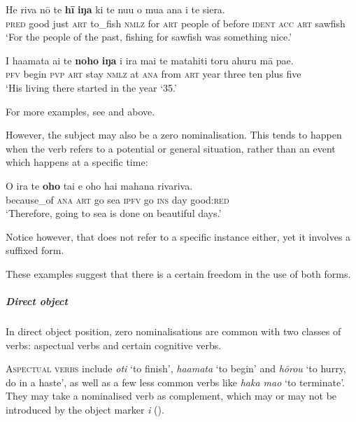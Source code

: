 \ea\label{ex:3.35}
\gll He riva nō te \textbf{hī} \textbf{iŋa} ki te nu{\ꞌ}u o mu{\ꞌ}a {\ꞌ}ana i te siera.\\
\textsc{pred} good just \textsc{art} to\_fish \textsc{nmlz} for \textsc{art} people of before \textsc{ident} \textsc{acc} \textsc{art} sawfish\\

\glt 
‘For the people of the past, fishing for sawfish was something nice.’ \textstyleExampleref{[R364.019]} 
\z

\ea\label{ex:3.36}
\gll I ha{\ꞌ}amata ai te \textbf{noho} \textbf{iŋa} {\ꞌ}i ira mai te matahiti toru {\ꞌ}ahuru mā pae. \\
\textsc{pfv} begin \textsc{pvp} \textsc{art} stay \textsc{nmlz} at \textsc{ana} from \textsc{art} year three ten plus five \\

\glt
‘His living there started in the year ‘35.’ \textstyleExampleref{[R539-1.492]}
\z

For more examples, see  and  above.

\newpage 
However, the subject may also be a zero nominalisation. This tends to happen when the verb refers to a potential or general situation, rather than an event which happens at a specific time:

\ea\label{ex:3.37}
\gll {\ꞌ}O ira te \textbf{oho} tai e oho hai mahana rivariva.\\
because\_of \textsc{ana} \textsc{art} go sea \textsc{ipfv} go \textsc{ins} day good:\textsc{red}\\

\glt
‘Therefore, going to sea is done on beautiful days.’ \textstyleExampleref{[R354.016]} 
\z

Notice however, that  does not refer to a specific instance either, yet it involves a suffixed form. 

These examples suggest that there is a certain freedom in the use of both forms.

\subparagraph{Direct object} In direct object position, zero nominalisations are common with two classes of verbs: aspectual verbs and certain cognitive verbs.

\textsc{Aspectual verbs} include \textit{oti} ‘to finish’, \textit{ha{\ꞌ}amata} ‘to begin’ and \textit{hōrou} ‘to hurry, do in a haste’, as well as a few less common verbs like \textit{haka mao} ‘to terminate’. They may take a nominalised verb as complement, which may or may not be introduced by the object marker \textit{i} (). 


